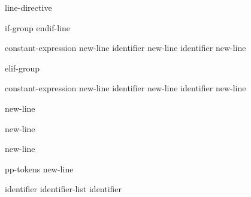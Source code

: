 \begin{bnf}
\br
    line-directive 
\end{bnf}

\begin{bnf}
\br
    if-group   endif-line
\end{bnf}

\begin{bnf}
\br
     constant-expression new-line \br
     identifier new-line \br
     identifier new-line 
\end{bnf}

\begin{bnf}
\br
    elif-group 
\end{bnf}

\begin{bnf}
\br
     constant-expression new-line \br
     identifier new-line \br
     identifier new-line 
\end{bnf}

\begin{bnf}
\br
     new-line 
\end{bnf}

\begin{bnf}
\br
     new-line
\end{bnf}

\begin{bnf}
\br
     new-line
\end{bnf}

\begin{bnf}
\br
    pp-tokens new-line
\end{bnf}

\begin{bnf}
\br
\end{bnf}

\begin{bnf}
\br
    identifier\br
    identifier-list \terminal{,} identifier
\end{bnf}

